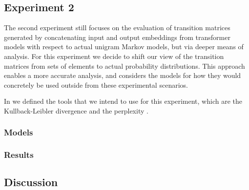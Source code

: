 \subsection{Experiment 2}

The second experiment still focuses on the evaluation of transition matrices generated by concatenating input and output embeddings from transformer models with respect to actual unigram Markov models, but via deeper means of analysis.
For this experiment we decide to shift our view of the transition matrices from sets of elements to actual probability distributions.
This approach enables a more accurate analysis, and considers the models for how they would concretely be used outside from these experimental scenarios.

In  we defined the tools that we intend to use for this experiment, which are the Kullback-Leibler divergence  and the perplexity .


\subsubsection{Models}

\subsubsection{Results}



\subsection{Discussion}

